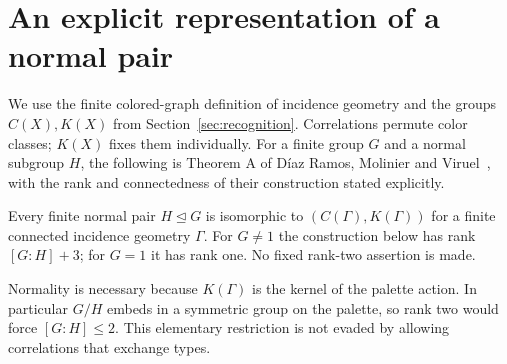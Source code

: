 \section{An explicit representation of a normal pair}
\label{sec:pairs}
We use the finite colored-graph definition of incidence geometry and the groups
$C(X),K(X)$ from Section~\ref{sec:recognition}. Correlations permute color
classes; $K(X)$ fixes them individually. For a finite group $G$ and a normal
subgroup $H$, the following is Theorem A of D\'iaz Ramos, Molinier and
Viruel~\cite{DMV}, with the rank and connectedness of their construction stated
explicitly.

\begin{theorem}\label{UR.FinitePairs}
Every finite normal pair $H\mathrel{\trianglelefteq}G$ is isomorphic to
$(C(\Gamma),K(\Gamma))$ for a finite connected incidence geometry $\Gamma$.
For $G\ne1$ the construction below has rank $[G:H]+3$; for $G=1$ it has rank
one. No fixed rank-two assertion is made.
\end{theorem}

Normality is necessary because $K(\Gamma)$ is the kernel of the palette action.
In particular $G/H$ embeds in a symmetric group on the palette, so rank two
would force $[G:H]\leq2$. This elementary restriction is not evaded by
allowing correlations that exchange types.

